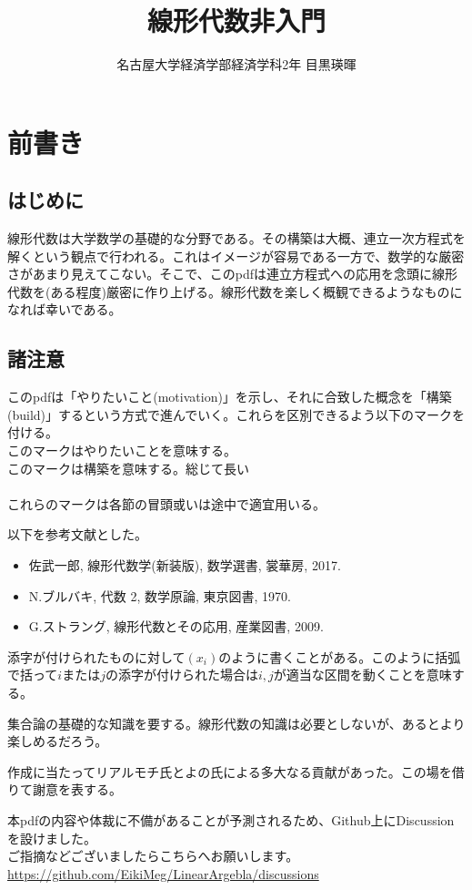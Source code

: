 \documentclass[dvipdfmx]{jsarticle}
\title{線形代数\.{非}入門}
\author{名古屋大学経済学部経済学科2年 目黒瑛暉}
\begin{document}
\maketitle
\tableofcontents
\newpage

\section{前書き}

\subsection{はじめに}
線形代数は大学数学の基礎的な分野である。その構築は大概、連立一次方程式を解くという観点で行われる。これはイメージが容易である一方で、数学的な厳密さがあまり見えてこない。そこで、このpdfは連立方程式への応用を念頭に線形代数を(ある程度)厳密に作り上げる。線形代数を楽しく概観できるようなものになれば幸いである。

\subsection{諸注意}
このpdfは「やりたいこと(motivation)」を示し、それに合致した概念を「構築(build)」するという方式で進んでいく。これらを区別できるよう以下のマークを付ける。
\\
\motiv このマークはやりたいことを意味する。\\
\build このマークは構築を意味する。{\scriptsize 総じて長い}\\~\\
これらのマークは各節の冒頭或いは途中で適宜用いる。\\\par
以下を参考文献とした。
\begin{itemize}
\item 佐武一郎, 線形代数学(新装版), 数学選書, 裳華房, 2017.
\item N.ブルバキ, 代数 2, 数学原論, 東京図書, 1970.
\item G.ストラング, 線形代数とその応用, 産業図書, 2009.
\end{itemize}\par
添字が付けられたものに対して$(x_i)$のように書くことがある。このように括弧で括って$i$または$j$の添字が付けられた場合は$i,j$が適当な区間を動くことを意味する。\\\par
集合論の基礎的な知識を要する。線形代数の知識は必要としないが、あるとより楽しめるだろう。\\\par
作成に当たってリアルモチ氏とよの氏による多大なる貢献があった。この場を借りて謝意を表する。\\\par
本pdfの内容や体裁に不備があることが予測されるため、Github上にDiscussionを設けました。\\
ご指摘などございましたらこちらへお願いします。{\scriptsize \url{https://github.com/EikiMeg/LinearArgebla/discussions}}
\newpage
\end{document}
